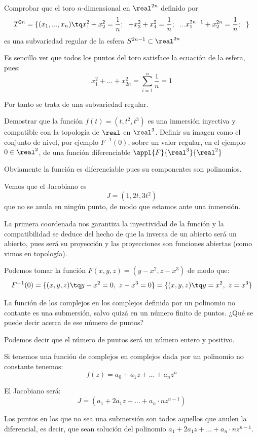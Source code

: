 \begin{problem}[4]

Comprobar que el toro $n$-dimensional en $\real^{2n}$ definido por
\[T^{2n} = \{(x_1,...,x_n) \tq x_1^2+x_2^2 = \frac{1}{n}; \ \; + x_3^2+x_4^2 = \frac{1}{n}; \ \;...x_1^{2n-1}+x_2^{2n} = \frac{1}{n}; \ \; \}\]
es una subvariedad regular de la esfera $S^{2n-1} \subset \real^{2n}$

\solution


Es sencillo ver que todos los puntos del toro satisface la ecuación de la esfera, pues:
\[x_1^2+...+x_{2n}^2 = \sum_{i=1}^n \frac{1}{n} = 1\]

Por tanto se trata de una subvariedad regular.
\end{problem}

\begin{problem}[5]
Demostrar que la función $f(t)=(t,t^2,t^3)$ es una inmersión inyectiva y compatible con la topología de $\real$ en $\real^3$. Definir su imagen como el conjunto de nivel, por ejemplo $F^{-1}(0)$, sobre un valor regular, en el ejemplo $0 \in \real^2$, de una función diferenciable $\appl{F}{\real^3}{\real^2}$
\solution


Obviamente la función es diferenciable pues su componentes son polinomios.

Vemos que el Jacobiano es
\[J=(1,2t,3t^2)\]
que no se anula en ningún punto, de modo que estamos ante una inmersión.

La primera coordenada nos garantiza la inyectividad de la función y la compatibilidad se deduce del hecho de que la inversa de un abierto será un abierto, pues será su proyección y las proyecciones son funciones abiertas (como vimos en topología).

Podemos tomar la función $F(x,y,z)=(y-x^2, z-x^3)$ de modo que:
\[F^{-1}(0)=\{(x,y,z) \tq y-x^2 = 0, \ z-x^3=0\} = \{(x,y,z) \tq y=x^2, \ z= x^3\}\]
\end{problem}

\begin{problem}[6]
La función de los complejos en los complejos definida por un polinomio no contante es una submersión, salvo quizá en un número finito de puntos. ¿Qué se puede decir acerca de ese número de puntos?
\solution


Podemos decir que el número de puntos será un número entero y positivo.

Si tenemos una función de complejos en complejos dada por un polinomio no constante tenemos:
\[f(z)=a_0+a_1z+...+a_nz^n\]

El Jacobiano será:
\[J=(a_1+2a_1z+...+a_n\cdot n z^{n-1})\]

Los puntos en los que no sea una submersión son todos aquellos que anulen la diferencial, es decir, que sean solución del polinomio $a_1+2a_1z+...+a_n\cdot n z^{n-1}$.

\end{problem}

